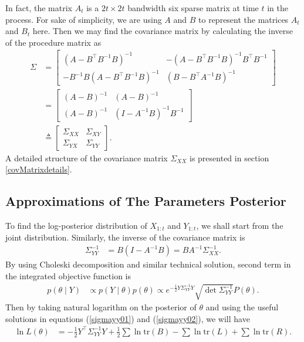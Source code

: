 In fact, the matrix $A_t$ is a $2t \times 2t$ bandwidth six sparse matrix at time $t$ in the process. For sake of simplicity, we are using $A$ and $B$ to represent the matrices  $A_t$ and $B_t$ here. Then we may find the covariance matrix by calculating the inverse of the procedure matrix as 
\begin{align*}
\Sigma &= \begin{bmatrix}
(A-B^\top B^{-1}B) ^{-1} & -(A-B^\top B^{-1}B)^{-1}B^\top B^{-1}\\
- B^{-1}B(A-B^\top B^{-1}B)^{-1} & (B-B^\top A^{-1}B) ^{-1}
\end{bmatrix} \\
&= \begin{bmatrix}
(A-B) ^{-1} & (A-B)^{-1}\\
(A-B)^{-1} & (I- A^{-1}B) ^{-1}B^{-1}
\end{bmatrix} \\
&\triangleq \begin{bmatrix}
\Sigma_{XX} & \Sigma_{XY} \\
\Sigma_{YX}  &\Sigma_{YY} 
\end{bmatrix}.
\end{align*}
A detailed structure of the covariance matrix $\Sigma_{XX} $ is presented in section \ref{covMatrixdetails}. 

\subsection{Approximations of The Parameters Posterior}

To find the log-posterior distribution of $X_{1:t}$ and $Y_{1:t}$, we shall start from the joint distribution. Similarly, the inverse of the covariance matrix is 
\begin{align*}
\Sigma_{YY}^{-1} &= B(I-A^{-1}B)= BA^{-1}\Sigma_{XX}^{-1}.
\end{align*}
By using Choleski decomposition and similar technical solution, second term in the integrated objective function is 
\begin{align*}
p(\theta \mid Y) &\propto p(Y\mid\theta)p(\theta) \propto e^{-\frac{1}{2} Y \Sigma_{YY}^{-1} Y } \sqrt{\det \Sigma_{YY}^{-1}} P(\theta).
\end{align*}
Then by taking natural logarithm on the posterior of $\theta$ and using the useful solutions in equations (\ref{sigmayy01}) and (\ref{sigmayy02}), we will have
\begin{align}\label{logL}
\ln L(\theta) &= -\frac{1}{2}Y^\top\Sigma_{YY}^{-1}Y+\frac{1}{2}\sum\ln\mbox{tr}(B)-\sum\ln\mbox{tr}(L)+\sum\ln\mbox{tr}(R).
\end{align}




